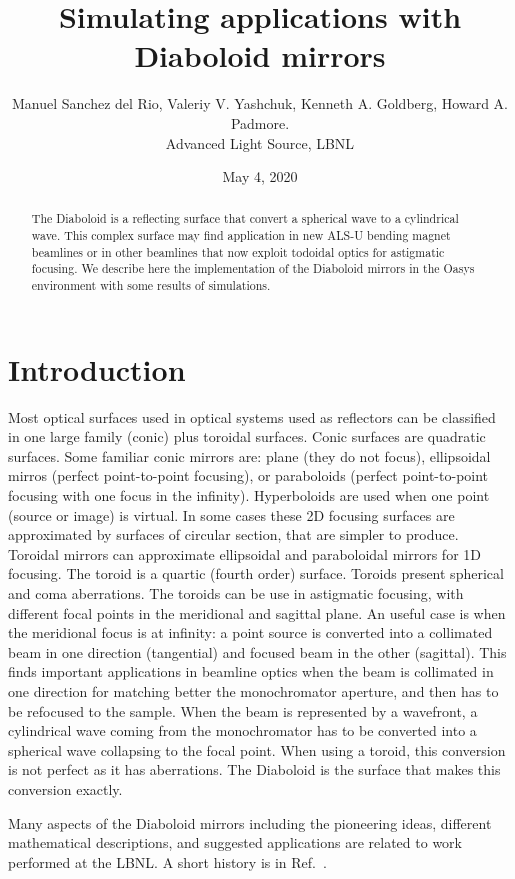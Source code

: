 \documentclass[a4paper, 11pt]{article}
\title{Simulating applications with Diaboloid mirrors}
\author{Manuel Sanchez del Rio, Valeriy V. Yashchuk,  Kenneth A. Goldberg, Howard A. Padmore.  \\ Advanced Light Source, LBNL}
\date{May 4, 2020}
\begin{document}
\maketitle

\begin{abstract}
The Diaboloid is a reflecting surface that convert a spherical wave to a cylindrical wave. This complex surface may find application in new ALS-U bending magnet beamlines or in other  beamlines that now exploit todoidal optics for astigmatic focusing. We describe here the implementation of the Diaboloid mirrors in the Oasys environment with some results of  simulations. 
\end{abstract}

\section{Introduction}

Most optical surfaces used in optical systems used as reflectors can be classified in one large family (conic) plus toroidal surfaces. Conic surfaces are quadratic surfaces. Some familiar conic mirrors are: plane (they do not focus), ellipsoidal mirros (perfect point-to-point focusing), or paraboloids (perfect point-to-point focusing with one focus in the infinity). Hyperboloids are used when one point (source or image) is virtual. In some cases these 2D focusing surfaces are approximated by surfaces of circular section, that are simpler to produce. Toroidal mirrors can approximate ellipsoidal and paraboloidal mirrors for 1D focusing. The toroid is a quartic (fourth order) surface. Toroids present spherical and coma aberrations. The toroids can be use in astigmatic focusing, with different focal points in the meridional and sagittal plane. An useful case is when the meridional focus is at infinity: a point source is converted into a collimated beam in one direction (tangential) and focused beam in the other (sagittal). This finds important applications in beamline optics when the beam is collimated in one direction for matching better the monochromator aperture, and then has to be refocused to the sample. When the beam is represented by a wavefront, a cylindrical wave coming from the monochromator has to be converted into a spherical wave collapsing to the focal point. When using a toroid, this conversion is not perfect as it has aberrations. The Diaboloid is the surface that makes this conversion exactly. 

Many aspects of the Diaboloid mirrors including the pioneering ideas, different mathematical descriptions, and suggested applications are related to work performed at the LBNL. A short history is in Ref.~\cite{Goldberg2020}.
\end{document}
